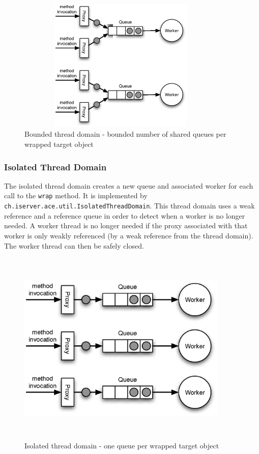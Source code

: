 \begin{figure}[H]
 \centering
 \includegraphics[width=10cm,height=6.4cm]{../images/finalreport/threaddomain_bounded.eps}
 \caption{Bounded thread domain - bounded number of shared queues per wrapped target object}
\end{figure}

\subsubsection{Isolated Thread Domain}
The isolated thread domain creates a new queue and associated worker
for each call to the \texttt{wrap} method. It is implemented by
\texttt{ch.iserver.ace.util.IsolatedThreadDomain}. This thread domain
uses a weak reference and a reference queue in order to detect when
a worker is no longer needed. A worker thread is no longer needed if the
proxy associated with that worker is only weakly referenced (by a weak
reference from the thread domain). The worker thread can then be
safely closed.

\begin{figure}[H]
 \centering
 \includegraphics[width=10cm,height=9.4cm]{../images/finalreport/threaddomain_isolated.eps}
 \caption{Isolated thread domain - one queue per wrapped target object}
\end{figure}


